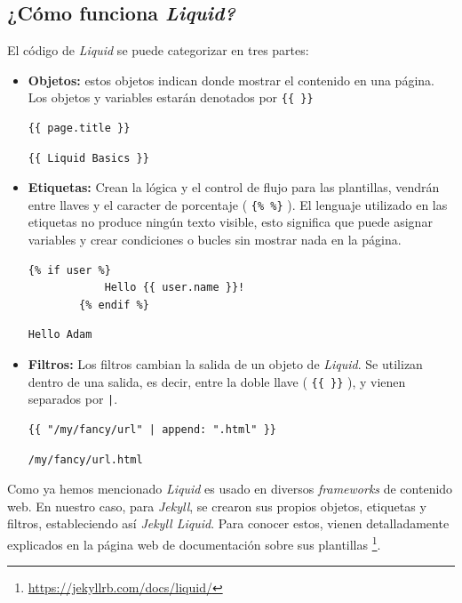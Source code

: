 \subsection*{¿Cómo funciona \emph{Liquid?}}
El código de  \emph{Liquid} se puede categorizar en tres partes:
\begin{itemize}
    \item \textbf{Objetos:} estos objetos indican donde mostrar el contenido en una página. Los objetos y variables estarán denotados por \texttt{\{\{ \}\}}
    \begin{lstlisting}[title=Código 1: Input. Objetos]
    {{ page.title }}
    \end{lstlisting}
    \begin{lstlisting}[title=Código 2: Output. Objetos]
    {{ Liquid Basics }}
    \end{lstlisting}
    \item \textbf{Etiquetas:} Crean la lógica y el control de flujo para las plantillas, vendrán entre llaves y el caracter de porcentaje ( \texttt{\{\%  \%\}} ). El lenguaje utilizado en las etiquetas no produce ningún texto visible, esto significa que puede asignar variables y crear condiciones o bucles sin mostrar nada en la página.
    \begin{lstlisting}[title=Código 3: Input. Etiquetas]
        {% if user %}
            Hello {{ user.name }}!
        {% endif %}
    \end{lstlisting}
    \begin{lstlisting}[title=Código 4: Output. Etiquetas]
        Hello Adam
    \end{lstlisting}
    \item \textbf{Filtros:} Los filtros cambian la salida de un objeto de \emph{Liquid}. Se utilizan dentro de una salida, es decir, entre la doble llave ( \texttt{\{\{ \}\}} ), y vienen separados por \texttt{|}.
    \begin{lstlisting}[title=Código 5: Input. Filtros]
    {{ "/my/fancy/url" | append: ".html" }}
    \end{lstlisting}
    \begin{lstlisting}[title=Código 6: Output. Filtros]
    /my/fancy/url.html
    \end{lstlisting}
\end{itemize}

Como ya hemos mencionado \emph{Liquid} es usado en diversos \emph{frameworks} de contenido web. En nuestro caso, para \emph{Jekyll}, se crearon sus propios objetos, etiquetas y filtros, estableciendo así \emph{Jekyll Liquid}. Para conocer estos, vienen detalladamente explicados  en la página web de  documentación sobre sus plantillas \footnote{\url{https://jekyllrb.com/docs/liquid/}}.

